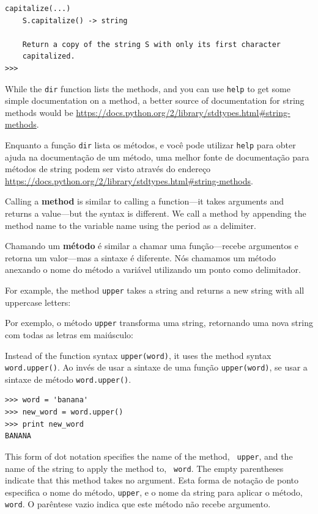 {\begin{verbatim}
capitalize(...)
    S.capitalize() -> string

    Return a copy of the string S with only its first character
    capitalized.
>>>
\end{verbatim}
\afterverb
%

While the {\tt dir} function lists the methods, and you 
can use {\tt help} to get some simple documentation on a method, 
a better source of documentation for string methods would be
\url{https://docs.python.org/2/library/stdtypes.html#string-methods}.

Enquanto a função {\tt dir} lista os métodos, e você pode utilizar {\tt help}
para obter ajuda na documentação de um método, uma melhor fonte de
documentação para métodos de string podem ser visto através do endereço
\url{https://docs.python.org/2/library/stdtypes.html#string-methods}.

Calling a {\bf method} is similar to calling a function---it 
takes arguments and returns a value---but the syntax is different.
We call a method by appending the method name to the variable name
using the period as a delimiter.

Chamando um {\bf método} é similar a chamar uma função---recebe argumentos e
retorna um valor---mas a sintaxe é diferente. Nós chamamos um método anexando
o nome do método a variável utilizando um ponto como delimitador.

For example, the
method {\tt upper} takes a string and returns a new string with
all uppercase letters:

Por exemplo, o método {\tt upper} transforma uma string, retornando uma nova
string com todas as letras em maiúsculo:


Instead of the function syntax {\tt upper(word)}, it uses
the method syntax {\tt word.upper()}.
Ao invés de usar a sintaxe de uma função {\tt upper(word)}, se usar a sintaxe
de método {\tt word.upper()}.


\beforeverb
\begin{verbatim}
>>> word = 'banana'
>>> new_word = word.upper()
>>> print new_word
BANANA
\end{verbatim}
\afterverb
%
This form of dot notation specifies the name of the method, {\tt
upper}, and the name of the string to apply the method to, {\tt
word}.  The empty parentheses indicate that this method takes no
argument.
%
Esta forma de notação de ponto especifica o nome do método, {\tt upper}, e
o nome da string para aplicar o método, {\tt word}. O parêntese vazio indica
que este método não recebe argumento.

}
